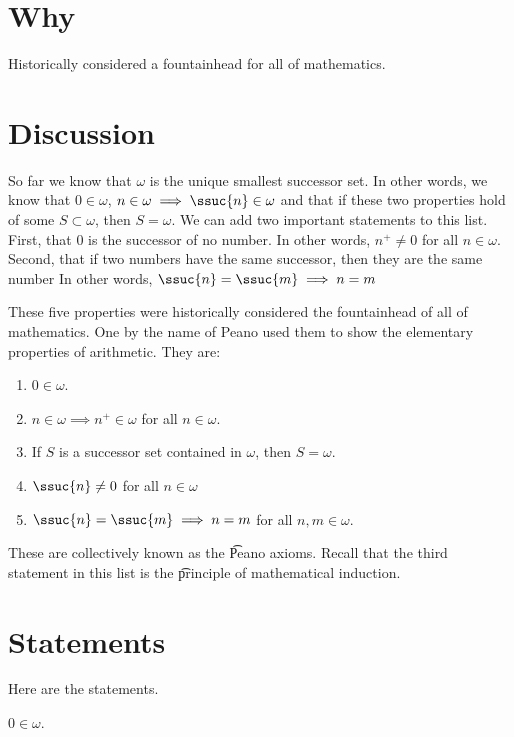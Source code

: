 
\section*{Why}

Historically considered a fountainhead for all of mathematics.

\section*{Discussion}

So far we know that $\omega $ is the unique smallest successor set.
In other words, we know that $0 \in \omega $, $n \in \omega \implies \ssuc{n} \in \omega $ and that if these two properties hold of some $S \subset \omega $, then $S = \omega $.
We can add two important statements to this list.
First, that 0 is the successor of no number.
In other words, $n^+ \neq 0$ for all $n \in \omega $.
Second, that if two numbers have the same successor, then they are the same number
In other words, $\ssuc{n} = \ssuc{m} \implies n = m$

These five properties were historically considered the fountainhead of all of mathematics.
One by the name of Peano used them to show the elementary properties of arithmetic.
They are:
    \begin{enumerate}
      \item $0 \in \omega $.
      \item $n \in \omega  \implies n^+ \in \omega $ for all $n \in \omega $.
      \item If $S$ is a successor set contained in $\omega $, then $S = \omega $.
      \item $\ssuc{n} \neq 0$ for all $n \in \omega $
      \item $\ssuc{n} = \ssuc{m} \implies n = m$ for all $n, m \in \omega $.
    \end{enumerate}

These are collectively known as the \t{Peano axioms}.
Recall that the third statement in this list is the \t{principle of mathematical induction}.

\section*{Statements}

Here are the statements.

\begin{proposition}
$0 \in \omega$.
\end{proposition}

